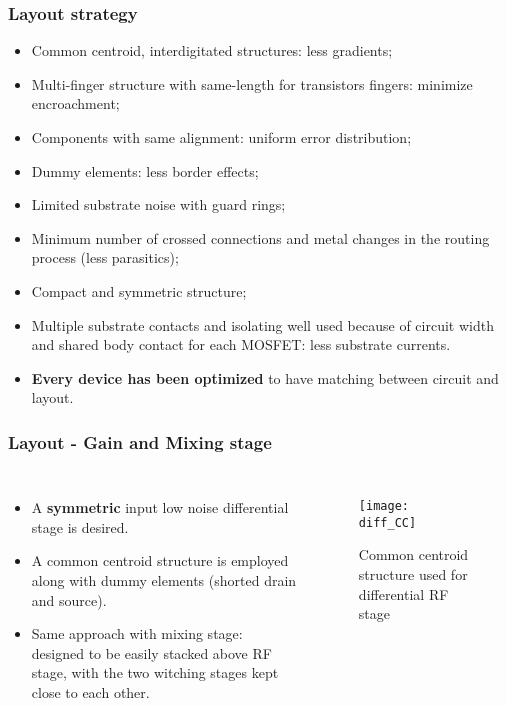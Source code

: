 \begin{frame}
	\frametitle{Layout strategy}
	\begin{itemize}
		\item Common centroid, interdigitated structures: less gradients;
		\item Multi-finger structure with same-length for transistors fingers: minimize encroachment;
		\item Components with same alignment: uniform error distribution;
		\item Dummy elements: less border effects;
		\item Limited substrate noise with guard rings;
		\item Minimum number of crossed connections and metal changes in the routing process (less parasitics);
		\item Compact and symmetric structure;
		\item Multiple substrate contacts and isolating well used because of circuit width and shared body contact for each MOSFET: less substrate currents.
		\item \textbf{Every device has been optimized} to have matching between circuit and layout.  
	\end{itemize}
\end{frame}

\begin{frame}
	\frametitle{Layout - Gain and Mixing stage}
	\begin{columns}
		\begin{itemize}
		\item A \textbf{symmetric} input low noise differential stage is desired.
		\item A common centroid structure is employed along with dummy elements (shorted drain and source).
		\item Same approach with mixing stage: designed to be easily stacked above RF stage, with the two witching stages kept close to each other.
		\end{itemize}
		\begin{figure}[H]
			\centering
			\texttt{[image: diff\_CC]}
			\caption{Common centroid structure used for differential RF stage}
			\label{fig:diff_CC}
		\end{figure}
	\end{columns}
\end{frame}

